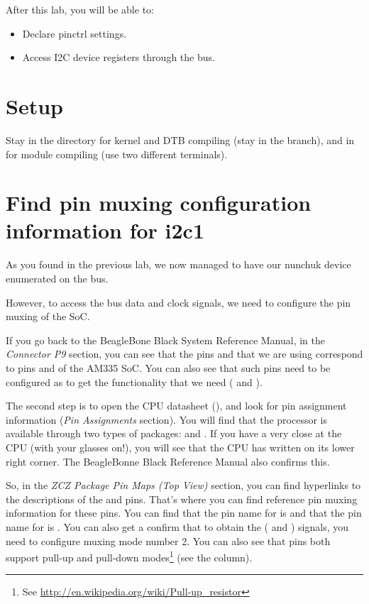 
After this lab, you will be able to:

\begin{itemize}
\item Declare pinctrl settings.
\item Access I2C device registers through the bus.
\end{itemize}

\section{Setup}

Stay in the  directory for kernel and DTB
compiling (stay in the  branch), and in
 for module compiling
(use two different terminals).

\section{Find pin muxing configuration information for i2c1}

As you found in the previous lab, we now managed to have our nunchuk
device enumerated on the  bus.

However, to access the bus data and clock signals, we need to configure
the pin muxing of the SoC.

If you go back to the BeagleBone Black System Reference Manual, in the
{\em Connector P9} section, you can see that the pins  and
 that we are using correspond to pins  and 
of the AM335 SoC. You can also see that such pins need to be configured 
as  to get the functionality that we need (
and ).

The second step is to open the CPU datasheet (), and
look for pin assignment information ({\em Pin Assignments} section).
You will find that the processor is available through two types of
packages:  and . If you have a very close at the CPU
(with your glasses on!), you will see that the CPU has  written
on its lower right corner. The BeagleBonne Black Reference Manual also
confirms this.

So, in the {\em ZCZ Package Pin Maps (Top View)} section, you can find 
hyperlinks to the descriptions of the  and  pins. 
That's where you can find reference pin muxing information for these
pins.  You can find that the pin name for  is 
and that the pin name for  is .
You can also get a confirm that to obtain the ( and
) signals, you need to configure muxing mode number 2.
You can also see that pins both support pull-up and pull-down
modes\footnote{See \url{http://en.wikipedia.org/wiki/Pull-up_resistor}}
(see the  column).

